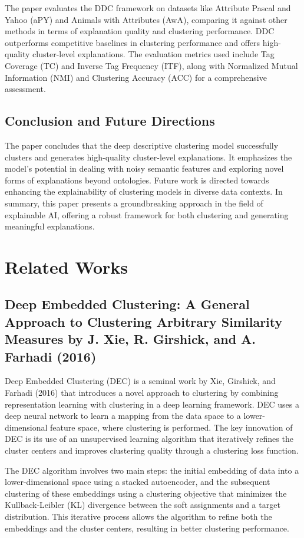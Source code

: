 The paper evaluates the DDC framework on datasets like Attribute Pascal and Yahoo (aPY) and Animals with Attributes (AwA), comparing it against other methods in terms of explanation quality and clustering performance. DDC outperforms competitive baselines in clustering performance and offers high-quality cluster-level explanations. The evaluation metrics used include Tag Coverage (TC) and Inverse Tag Frequency (ITF), along with Normalized Mutual Information (NMI) and Clustering Accuracy (ACC) for a comprehensive assessment.

\subsection{Conclusion and Future Directions}

The paper concludes that the deep descriptive clustering model successfully clusters and generates high-quality cluster-level explanations. It emphasizes the model's potential in dealing with noisy semantic features and exploring novel forms of explanations beyond ontologies. Future work is directed towards enhancing the explainability of clustering models in diverse data contexts. In summary, this paper presents a groundbreaking approach in the field of explainable AI, offering a robust framework for both clustering and generating meaningful explanations.

\section{Related Works}

\subsection{Deep Embedded Clustering: A General Approach to Clustering Arbitrary Similarity Measures by J. Xie, R. Girshick, and A. Farhadi (2016)}

Deep Embedded Clustering (DEC) is a seminal work by Xie, Girshick, and Farhadi (2016) that introduces a novel approach to clustering by combining representation learning with clustering in a deep learning framework. DEC uses a deep neural network to learn a mapping from the data space to a lower-dimensional feature space, where clustering is performed. The key innovation of DEC is its use of an unsupervised learning algorithm that iteratively refines the cluster centers and improves clustering quality through a clustering loss function.

The DEC algorithm involves two main steps: the initial embedding of data into a lower-dimensional space using a stacked autoencoder, and the subsequent clustering of these embeddings using a clustering objective that minimizes the Kullback-Leibler (KL) divergence between the soft assignments and a target distribution. This iterative process allows the algorithm to refine both the embeddings and the cluster centers, resulting in better clustering performance.


